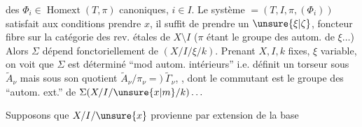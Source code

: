 des $\Phi_i\in\operatorname{Homext}(T,\pi)$ canoniques,
$i\in I$. Le système
$=(T,I,\pi,(\Phi_i))$
satisfait aux conditions  
   prendre $x$, il suffit
de prendre un $\unsure{\xi|\zeta}$, foncteur fibre sur
la catégorie des rev. étales de $X\setminus I$
($\pi$ étant le groupe des autom. de $\xi\ldots$)
Alors $\Sigma$ dépend fonctoriellement de
$(X/I/\xi/k)$. Prenant $X,I,k$ fixes,
$\xi$ variable, on voit que $\Sigma$ est déterminé
``mod autom. intérieurs'' i.e. 
définit un torseur  
sous $\widetilde A_\nu$ mais sous son quotient
$\widetilde A_\nu/\pi_\nu=)\ \widetilde\Gamma_\nu$,
, 
dont le commutant est le groupe
des ``autom. ext.'' de 
$\Sigma(X/I/\unsure{x|m}/k)\ldots$

Supposons que $X/I/\unsure{x}$ provienne
par extension de la base 
